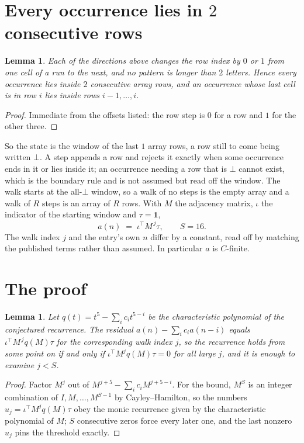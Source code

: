 \documentclass[11pt,a4paper]{article}
\theoremstyle{plain}
\newtheorem{lemma}[theorem]{Lemma}
\theoremstyle{definition}
\begin{document}
\section{Every occurrence lies in $2$ consecutive rows}

\begin{lemma}\label{lem:win}
Each of the directions above changes the row index by $0$ or $1$ from one cell of a run to the
next, and no pattern is longer than $2$ letters. Hence every occurrence lies inside $2$
consecutive array rows, and an occurrence whose last cell is in row $i$ lies inside rows
$i-1,\dots,i$.
\end{lemma}

\begin{proof}
Immediate from the offsets listed: the row step is $0$ for a row and $1$ for the other three.
\end{proof}

So the state is the window of the last $1$ array rows, a row still to come being written
$\bot$. A step appends a row and rejects it exactly when some occurrence ends in it or lies
inside it; an occurrence needing a row that is $\bot$ cannot exist, which is the boundary rule
and is not assumed but read off the window. The walk starts at the all-$\bot$ window, so a walk
of no steps is the empty array and a walk of $R$ steps is an array of $R$ rows. With $M$ the
adjacency matrix, $\iota$ the indicator of the starting window and $\tau=\mathbf{1}$,
\[
a(n)\;=\;\iota^{\!\top}M^{\,j}\tau ,\qquad S=16.
\]
The walk index $j$ and the entry's own $n$ differ by a constant, read off by matching the
published terms rather than assumed. In particular $a$ is $C$-finite.

\section{The proof}

\begin{lemma}\label{lem:crit}
Let $q(t)=t^{5}-\sum_i c_it^{5-i}$ be the characteristic polynomial of the
conjectured recurrence. The residual $a(n)-\sum_ic_ia(n-i)$ equals
$\iota^{\!\top}M^{\,j}q(M)\tau$ for the corresponding walk index $j$, so the recurrence
holds from some point on if and only if $\iota^{\!\top}M^{j}q(M)\tau=0$ for all large $j$,
and it is enough to examine $j<S$.
\end{lemma}

\begin{proof}
Factor $M^{j}$ out of $M^{j+5}-\sum_ic_iM^{j+5-i}$. For the bound, $M^{S}$
is an integer combination of $I,M,\dots,M^{S-1}$ by Cayley--Hamilton, so the numbers
$u_j=\iota^{\!\top}M^{j}q(M)\tau$ obey the monic recurrence given by the characteristic
polynomial of $M$; $S$ consecutive zeros force every later one, and the last nonzero $u_j$
pins the threshold exactly.
\end{proof}
\end{document}

